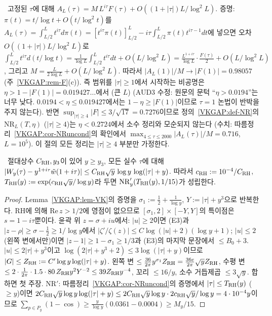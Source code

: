\begin{remark}\label{VKGAP:rem-cutoff}
\ 고정된 $\tau$에 대해 $A_L(\tau)=M\,L^{i\tau}F(\tau)+O((1+|\tau|)L/\log^2L)$.
증명: $\pi(t)=t/\log t+O(t/\log^2t)$를 $A_L(\tau)=\int_{L/2}^Lt^{i\tau}d\pi(t)=[t^{i\tau}\pi(t)]_{L/2}^L-i\tau\int_{L/2}^L\pi(t)t^{i\tau-1}dt$에 넣으면
오차 $O((1+|\tau|)L/\log^2L)$로 $\int_{L/2}^Lt^{i\tau}d(t/\log t)=\frac1{\log L}\int_{L/2}^Lt^{i\tau}dt+O(L/\log^2L)=\frac{L^{1+i\tau}}{\log L}\cdot\frac{F(\tau)}{2}+O(L/\log^2L)$,
그리고 $M=\frac{L}{2\log L}+O(L/\log^2L)$. 따라서 $|A_L(1)|/M\to|F(1)|=0.98057$ (주~\ref{VKGAP:rem-F}(c)).
즉 범위를 $|\tau|\ge1$에서 시작하는 비공명은 $\eta>1-|F(1)|=0.019427\ldots$에서 \REFUTED{} (큰 $L$)
(AUD3 수정: 원문의 문턱 ``$\eta>0.0194$''는 너무 낮다. $0.0194<\eta\le0.019427$에서는 $1-\eta\ge|F(1)|$이므로 $\tau=1$ 논법이 반박을 주지 않는다). 반면 $\sup_{|\tau|\ge4}|F|\le3/\sqrt{17}=0.7276$이므로
정의~\ref{VKGAP:def-NR}의 $\mathrm{NR}_L(T,\eta)$ ($|\tau|\ge4$)는 $\eta<0.2724$에서 소수 정리와 모순되지 않는다
(수치: 따름정리~\ref{VKGAP:cor-NRuncond}의 확인에서 $\max_{4\le\tau\le2000}|A_L(\tau)|/M=0.716$, $L=10^5$).
이 절의 모든 정리는 $|\tau|\ge4$ 부분만 가정한다.
\end{remark}

\begin{lemma}\label{VKGAP:lem-RH}
\ 절대상수 $C_{\rm RH},y_3$이 있어 $y\ge y_3$, 모든 실수 $\tau$에 대해
$|W_y(\tau)-y^{1+i\tau}\tilde w(1+i\tau)|\le C_{\rm RH}\sqrt y\,\log y\,\log(|\tau|+y)$.
따라서 $c_{\rm RH}:=10^{-4}/C_{\rm RH}$, $T_{\rm RH}(y):=\exp(c_{\rm RH}\sqrt y/\log y)$라 두면 $\mathrm{NR}'_y(T_{\rm RH}(y),1/15)$가 성립한다.
\end{lemma}
\begin{proof}
Lemma~\ref{VKGAP:lem-VK}의 증명을 $\sigma_1:=\frac12+\frac1{\log y}$, $Y:=|\tau|+y^3$으로 반복한다. RH에 의해 $\mathrm{Re}\,z>1/2$에 영점이 없으므로
$[\sigma_1,2]\times[-Y,Y]$의 특이점은 $s=1-i\tau$뿐이다. 윤곽 위 $z=\sigma+iu$에서: $|u|\ge2$이면 (E3)과 $|z-\rho|\ge\sigma-\frac12\ge1/\log y$에서
$|\zeta'/\zeta(z)|\le C\log(|u|+2)(\log y+1)$; $|u|\le2$ (왼쪽 변에서만)이면 $|z-1|\ge1-\sigma_1\ge1/3$과 (E3)의 마지막 문장에서 $\le B_0+3$.
$|u|\le 2|\tau|+y^3$이고 $\log(2|\tau|+y^3+2)\le3\log(|\tau|+y)$이므로 $|G|\le Z_{\rm RH}:=C'\log y\log(|\tau|+y)$. 왼쪽 변 $\le\frac{36}{2\pi}y^{\sigma_1}Z_{\rm RH}=\frac{36e}{2\pi}\sqrt yZ_{\rm RH}$,
수평 변 $\le2\cdot\frac{1}{2\pi}\cdot1.5\cdot80\,Z_{\rm RH}y^2Y^{-2}\le39Z_{\rm RH}y^{-4}$, 꼬리 $\le16/y$, 소수 거듭제곱 $\le3\sqrt y$. 합하면 첫 주장.
$\mathrm{NR}'$: 따름정리~\ref{VKGAP:cor-NRuncond}의 증명에서 $|\tau|\le T_{\rm RH}(y)$ ($\ge y$)이면
$2C_{\rm RH}\sqrt y\log y\log(|\tau|+y)\le 2C_{\rm RH}\sqrt y\log y\cdot 2c_{\rm RH}\sqrt y/\log y=4\cdot10^{-4}y$이므로
$\sum_{p\in P_y}(1-\cos)\ge\frac{y}{\log y}(0.0361-0.0004)\ge M_y/15$.
\end{proof}

